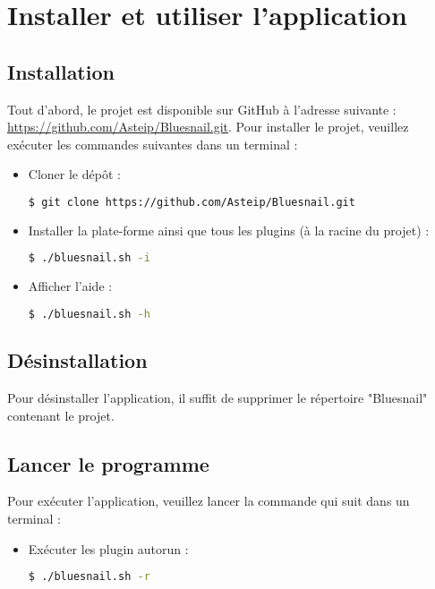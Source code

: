 \section{Installer et utiliser l'application}

\subsection{Installation}
    Tout d'abord, le projet est disponible sur GitHub à l'adresse suivante :  \url{https://github.com/Asteip/Bluesnail.git}. Pour installer le projet, veuillez exécuter les commandes suivantes dans un terminal :
    
    \begin{itemize}
        \item Cloner le dépôt :
        \begin{lstlisting}[language=bash]
        $ git clone https://github.com/Asteip/Bluesnail.git
        \end{lstlisting}
        
        \item Installer la plate-forme ainsi que tous les plugins (à la racine du projet) :
        \begin{lstlisting}[language=bash]
        $ ./bluesnail.sh -i
        \end{lstlisting}
        
        \item Afficher l'aide :
        \begin{lstlisting}[language=bash]
        $ ./bluesnail.sh -h
        \end{lstlisting}
    \end{itemize}
    
\subsection{Désinstallation}
    Pour désinstaller l'application, il suffit de supprimer le répertoire "Bluesnail" contenant le projet.
    
\subsection{Lancer le programme}
    Pour exécuter l'application, veuillez lancer la commande qui suit dans un terminal :

    \begin{itemize}
        \item Exécuter les plugin autorun :
        \begin{lstlisting}[language=bash]
        $ ./bluesnail.sh -r
        \end{lstlisting}
    \end{itemize}


